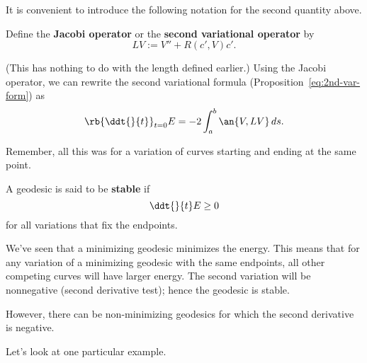 It is convenient to introduce the following notation for the second quantity above.
\begin{df}
Define the \textbf{Jacobi operator} or the \textbf{second variational operator} by
\[
LV:= V''+R(c',V)c'.
\]
\end{df}
(This has nothing to do with the length defined earlier.)
Using the Jacobi operator, we can rewrite the second variational formula (Proposition~\ref{eq:2nd-var-form}) as
\[
\rb{\ddt{}{t}}_{t=0} E=-2\int_a^b\an{V,LV}\,ds.
\]

Remember, all this was for a variation of curves starting and ending at the same point.

\begin{df}
A geodesic is said to be \textbf{stable} if
\[
\ddt{}{t}E\ge 0
\]
for all variations that fix the endpoints.
\end{df}
We've seen that a minimizing geodesic minimizes the energy. This means that for any variation of a minimizing geodesic with the same endpoints, all other competing curves will have larger energy. The second variation will be nonnegative (second derivative test); hence the geodesic is stable.

However, there can be non-minimizing geodesics for which the second derivative is negative.

Let's look at one particular example. 

